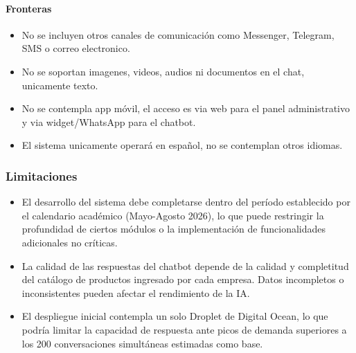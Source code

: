 \paragraph{Fronteras}
\begin{itemize}
    \item No se incluyen otros canales de comunicación como Messenger, Telegram, SMS o correo electronico.
    \item No se soportan imagenes, videos, audios ni documentos en el chat, unicamente texto.
    \item No se contempla app móvil, el acceso es via web para el panel administrativo y via widget/WhatsApp para el chatbot.
    \item El sistema unicamente operará en español, no se contemplan otros idiomas.
\end{itemize}

\subsubsection{Limitaciones}
\label{subsec:limitaciones}

\begin{itemize}
    \item El desarrollo del sistema debe completarse dentro del período establecido por el calendario académico (Mayo-Agosto 2026), lo que puede restringir la profundidad de ciertos módulos o la implementación de funcionalidades adicionales no críticas.
    \item La calidad de las respuestas del chatbot depende de la calidad y completitud del catálogo de productos ingresado por cada empresa. Datos incompletos o inconsistentes pueden afectar el rendimiento de la IA.
    \item El despliegue inicial contempla un solo Droplet de Digital Ocean, lo que podría limitar la capacidad de respuesta ante picos de demanda superiores a los 200 conversaciones simultáneas estimadas como base.
\end{itemize}




